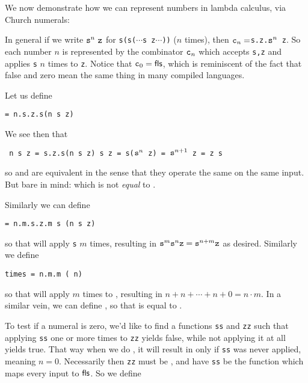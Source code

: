 We now demonstrate how we can represent numbers in lambda calculus, via Church numerals:

\medskip
\centerline{\vbox{}}
\medskip

In general if we write ${\tt s}^n\ \tt z$ for {\tt s(s($\cdots$s z$\cdots$))} ($n$ times), then $\cn n=${\tt\lambda s.\lambda z.${\tt s}^n$ z}.
So each number $n$ is represented by the combinator $\cn n$ which accepts {\tt s,z} and applies {\tt s} $n$ times to {\tt z}.
Notice that $\cn0=\fls$, which is reminiscent of the fact that false and zero mean the same thing in many compiled languages.

Let us define

\centerline{\tt \scc = \lambda n.\lambda s.\lambda z.s(n s z)}

We see then that

\centerline{\tt\scc\ \cn n s z = \lambda s.\lambda z.s(\cn n s z) s z = s(${\tt s}^n$ z) = ${\tt s}^{n+1}$ z =  z s}
so  and  are equivalent in the sense that they operate the same on the same input.
But bare in mind:  which is not {\it equal} to .

Similarly we can define

\centerline{\tt \plus = \lambda n.\lambda m.\lambda s.\lambda z.m s (n s z)}

so that  will apply {\tt s}  $m$ times, resulting in ${\tt s}^m{\tt s}^n{\tt z}={\tt s}^{n+m}{\tt z}$ as desired.
Similarly we define

\smallskip
\centerline{\tt times = \lambda n.\lambda m.m (\plus\ n) }

so that  will apply  $m$ times to , resulting in $n+n+\cdots+n+0=n\cdot m$.
In a similar vein, we can define , so that  is equal to .

To test if a numeral is zero, we'd like to find a functions {\tt ss} and {\tt zz} such that applying {\tt ss} one or more times to {\tt zz} yields false, while not applying it at all yields true.
That way when we do , it will result in \tru{} only if {\tt ss} was never applied, meaning $n=0$.
Necessarily then {\tt zz} must be \tru, and have {\tt ss} be the function which maps every input to ${\sf fls}$.
So we define

